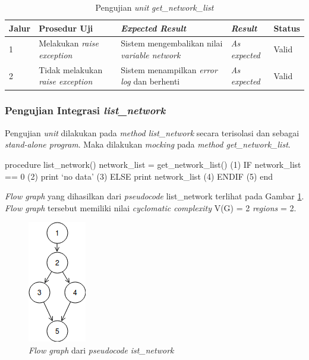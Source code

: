 \begin{longtable}{|P{.05\textwidth}|P{.30\textwidth}|P{.30\textwidth}|P{.10\textwidth}|P{.08\textwidth}|}
  \caption{Pengujian \emph{unit} \emph{get\_network\_list}} \label{jalur:get_list_network}\\
  \hline
  \textbf{Jalur} & \textbf{Prosedur Uji} & \textbf{\emph{Expected Result}}
  & \textbf{\emph{Result}} & \textbf{Status} \\\hline
  1 & Melakukan \emph{raise exception}  & Sistem mengembalikan nilai
                                          \emph{variable network} & \emph{As expected} & Valid \\\hline
  2 & Tidak melakukan \emph{raise exception} & Sistem menampilkan \emph{error log} dan
                                               berhenti & \emph{As expected} & Valid \\\hline
\end{longtable}

\subsubsection{Pengujian Integrasi \emph{list\_network}}

Pengujian \emph{unit} dilakukan pada \emph{method list\_network}
secara terisolasi dan sebagai \emph{stand-alone program}. Maka
dilakukan \emph{mocking} pada \emph{method get\_network\_list}.

\begin{code}
\begin{ignasicblock}[title=list\_network,minted language=text]
procedure list_network()
    network_list = get_network_list()     (1)
    IF network_list == 0                  (2)
        print `no data'                   (3)
    ELSE
        print network_list                (4)
    ENDIF                                 (5)
end
\end{ignasicblock}
\label{pc:ls-network}
\end{code}

\par\null\par
\noindent
\emph{Flow graph} yang dihasilkan dari \emph{pseudocode}
list\_network terlihat pada Gambar \ref{cfg:list_network}.
\emph{Flow graph} tersebut memiliki nilai \emph{cyclomatic complexity} V(G) = 2 \emph{regions} = 2.

\begin{figure}[H]
  \centering
  \includegraphics[width=.15\linewidth]{img/test-case/is_current_env}
  \caption{\emph{Flow graph} dari \emph{pseudocode} \emph{ist\_network}}
  \label{cfg:list_network}
\end{figure}

